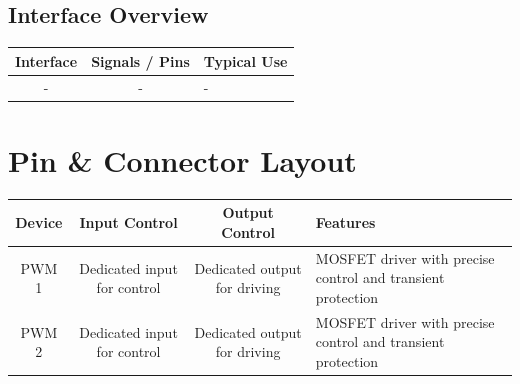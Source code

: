 \documentclass[10pt]{article}
\begin{document}
\subsection*{Interface Overview}
\begin{tabularx}{\textwidth}{|c|c|>{\RaggedRight\arraybackslash}X|}
\hline
\rowcolor{headergray}
Interface & Signals / Pins & Typical Use \\
\hline
- & - & - \\
\hline
\end{tabularx}


\section*{Pin \& Connector Layout}
\begin{tabularx}{\textwidth}{|c|c|c|>{\RaggedRight\arraybackslash}X|}
\hline
\rowcolor{headergray}
Device & Input Control & Output Control & Features \\
\hline
PWM 1 & Dedicated input for control & Dedicated output for driving & MOSFET driver with precise control and transient protection \\
PWM 2 & Dedicated input for control & Dedicated output for driving & MOSFET driver with precise control and transient protection \\
\hline
\end{tabularx}


\FloatBarrier
\newpage
\vspace*{3em}
\end{document}
